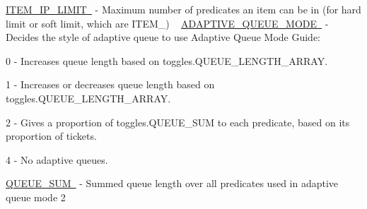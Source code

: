 \mbox{\hyperlink{namespacedynamicfilterapp_1_1toggles_a755f2e9edbb8b4d5039a950757b9cfb2}{I\+T\+E\+M\+\_\+\+I\+P\+\_\+\+L\+I\+M\+IT }} -\/ Maximum number of predicates an item can be in (for hard limit or soft limit, which are I\+T\+E\+M\+\_\+) ~\newline
 \mbox{\hyperlink{namespacedynamicfilterapp_1_1toggles_ae5f3a5957b65dd5d074c52ef01e0f732}{A\+D\+A\+P\+T\+I\+V\+E\+\_\+\+Q\+U\+E\+U\+E\+\_\+\+M\+O\+DE }} -\/ Decides the style of adaptive queue to use Adaptive Queue Mode Guide\+:
\begin{DoxyItemize}
\item 0 -\/ Increases queue length based on toggles.\+Q\+U\+E\+U\+E\+\_\+\+L\+E\+N\+G\+T\+H\+\_\+\+A\+R\+R\+AY.
\item 1 -\/ Increases or decreases queue length based on toggles.\+Q\+U\+E\+U\+E\+\_\+\+L\+E\+N\+G\+T\+H\+\_\+\+A\+R\+R\+AY.
\item 2 -\/ Gives a proportion of toggles.\+Q\+U\+E\+U\+E\+\_\+\+S\+UM to each predicate, based on its proportion of tickets.
\item 4 -\/ No adaptive queues.
\end{DoxyItemize}

\mbox{\hyperlink{namespacedynamicfilterapp_1_1toggles_a472153a69096a3f18b32cd5ac247f658}{Q\+U\+E\+U\+E\+\_\+\+S\+UM }} -\/ Summed queue length over all predicates used in adaptive queue mode 2

